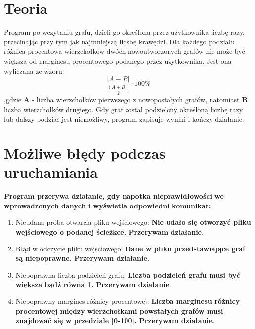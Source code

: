 \documentclass{article}
\begin{document}
\section*{Teoria}

Program po wczytaniu grafu, dzieli go określoną przez użytkownika liczbę razy, przecinając przy tym jak najmniejszą liczbę krawędzi. Dla każdego podziału różnica procentowa wierzchołków dwóch nowoutworzonych grafów nie może być większa od marginesu procentowego podanego przez użytkownika. Jest ona wyliczana ze wzoru: \[ \frac{|A - B|}{\frac{(A + B)}{2}} \cdot 100\%\],gdzie \textbf{A} - liczba wierzchołków pierwszego z nowopostałych grafów, natomiast \textbf{B} liczba wierzchołków drugiego. Gdy graf został podzielony określoną liczbę razy lub dalszy podział jest niemożliwy, program zapisuje wyniki i kończy działanie.

\section*{Możliwe błędy podczas uruchamiania}
\textbf{Program przerywa działanie, gdy napotka nieprawidłowości we wprowadzonych danych i wyświetla odpowiedni komunikat:}

\begin{enumerate}
  \item Nieudana próba otwarcia pliku wejściowego: \textbf{Nie udało się otworzyć pliku wejściowego o podanej ścieżkce. Przerywam działanie.}

  \item Błąd w odczycie pliku wejściowego: \textbf{Dane w pliku przedstawiające graf są niepoprawne. Przerywam działanie.}
  
  \item Niepoprawna liczba podzieleń grafu: \textbf{Liczba podzieleń grafu musi być większa bądź równa 1. Przerywam działanie.}
  
  \item Niepoprawny margines różnicy procentowej: \textbf{Liczba marginesu różnicy procentowej między wierzchołkami powstałych grafów musi znajdować się w przedziale [0-100]. Przerywam działanie.}
  
\end{enumerate}
\end{document}
